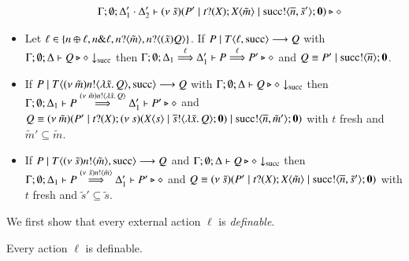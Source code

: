 \begin{definition}[Definibility]
\begin{itemize}
\begin{eqnarray*}
				& & \Gamma; \emptyset; \Delta_1' \cdot \Delta_2' \vdash (\nu\ \tilde{s})(P' \;|\; t ? (X) ; X\langle \tilde{m} \rangle  \;|\; \textrm{succ} ! \langle \overline{n}, \tilde{s}' \rangle ; \mathbf{0}) \triangleright \diamond
			\end{eqnarray*}
%
		\item	Let $\ell \in \{n \oplus \ell, n \& \ell, n ? \langle \tilde{m} \rangle, n ? \langle (\tilde{x}) Q \rangle\}$.
			If $P \;|\; T\langle \ell, \textrm{succ} \rangle \longrightarrow Q$ with			
			$\Gamma; \emptyset; \Delta \vdash Q \triangleright \diamond \downarrow_{\textrm{succ}}$ then 
			$\Gamma; \emptyset; \Delta_1 \stackrel{\ell}{\Longrightarrow} \Delta_1' \vdash P \stackrel{\ell}{\Longrightarrow} P' \triangleright \diamond$
			and $Q \equiv P' \;|\; \textrm{succ} ! \langle \overline{n} \rangle ; \mathbf{0}$.

		\item	If $P \;|\; T\langle (\nu\ \tilde{m})n ! \langle \lambda \tilde{x}.\,Q \rangle, \textrm{succ} \rangle \longrightarrow Q$
			with $\Gamma; \emptyset; \Delta \vdash Q \triangleright \diamond \downarrow_{\textrm{succ}}$ then
			$\Gamma; \emptyset; \Delta_1 \vdash P \stackrel{(\nu\ \tilde{m})n ! \langle \lambda \tilde{x}.\,Q \rangle}{\Longrightarrow} \Delta_1' \vdash P' \triangleright \diamond$
			and $Q \equiv (\nu\ \tilde{m})(P' \;|\; t ? (X) ; (\nu\ s)(X\langle s \rangle \;|\; \overline{s} ! \langle \lambda \tilde{x}.\,Q \rangle ; \mathbf{0}) \;|\; \textrm{succ} ! \langle \overline{n}, \tilde{m}' \rangle ; \mathbf{0})$
			with $t$ fresh and $\tilde{m}' \subseteq \tilde{m}$.

		\item	If $P \;|\; T\langle (\nu\ \tilde{s})n ! \langle \tilde{m} \rangle, \textrm{succ} \rangle \longrightarrow Q $
			and $\Gamma; \emptyset; \Delta \vdash Q \triangleright \diamond \downarrow_{\textrm{succ}}$ then
			$\Gamma; \emptyset; \Delta_1 \vdash P \stackrel{(\nu\ \tilde{s})n ! \langle \tilde{m} \rangle}{\Longrightarrow} \Delta_1' \vdash P' \triangleright \diamond$
			and $Q \equiv (\nu\ \tilde{s})(P' \;|\; t ? (X) ; X\langle \tilde{m} \rangle \;|\; \textrm{succ} ! \langle \overline{n}, \tilde{s}' \rangle ; \mathbf{0})$
			with $t$ fresh and $\tilde{s}' \subseteq \tilde{s}$.


	\end{itemize}	
%
\end{definition}

We first show that every external action $\ell$ is {\em definable}.

\begin{lemma}[Definibility]
	\label{lem:definibility}
	Every action $\ell$ is definable.
\end{lemma}

